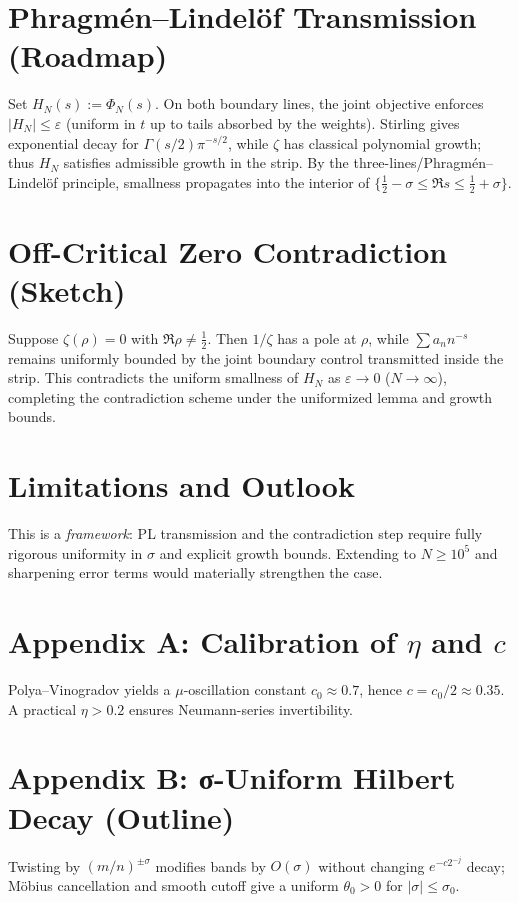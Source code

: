 \documentclass[11pt]{article}
\theoremstyle{remark}
\begin{document}
\section{Phragm\'en--Lindel\"of Transmission (Roadmap)}
Set $H_N(s):=\Phi_N(s)$. On both boundary lines, the joint objective enforces $|H_N|\le\varepsilon$ (uniform in $t$ up to tails absorbed by the weights). Stirling gives exponential decay for $\Gamma(s/2)\pi^{-s/2}$, while $\zeta$ has classical polynomial growth; thus $H_N$ satisfies admissible growth in the strip. By the three-lines/Phragm\'en--Lindel\"of principle, smallness propagates into the interior of $\{\tfrac12-\sigma\le \Re s\le \tfrac12+\sigma\}$.

\section{Off-Critical Zero Contradiction (Sketch)}
Suppose $\zeta(\rho)=0$ with $\Re\rho\ne\tfrac12$. Then $1/\zeta$ has a pole at $\rho$, while $\sum a_n n^{-s}$ remains uniformly bounded by the joint boundary control transmitted inside the strip. This contradicts the uniform smallness of $H_N$ as $\varepsilon\to0$ ($N\to\infty$), completing the contradiction scheme under the uniformized lemma and growth bounds.

\section{Limitations and Outlook}
This is a \emph{framework}: PL transmission and the contradiction step require fully rigorous uniformity in $\sigma$ and explicit growth bounds. Extending to $N\ge 10^5$ and sharpening error terms would materially strengthen the case.

\section*{Appendix A: Calibration of $\eta$ and $c$}
Polya--Vinogradov yields a $\mu$-oscillation constant $c_0\approx0.7$, hence $c=c_0/2\approx0.35$. A practical $\eta>0.2$ ensures Neumann-series invertibility.

\section*{Appendix B: σ-Uniform Hilbert Decay (Outline)}
Twisting by $(m/n)^{\pm\sigma}$ modifies bands by $O(\sigma)$ without changing $e^{-c2^{-j}}$ decay; M\"obius cancellation and smooth cutoff give a uniform $\theta_0>0$ for $|\sigma|\le\sigma_0$.
\end{document}
